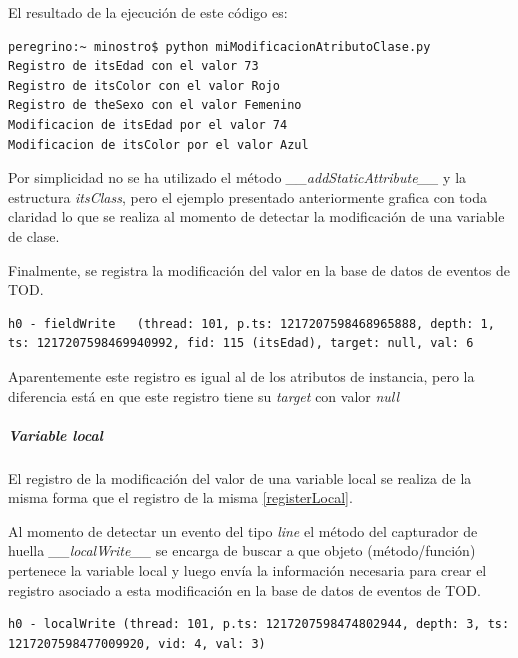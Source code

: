 \documentclass[12pt,legalpaper]{report}
\begin{document}
El resultado de la ejecución de este código es:

\begin{singlespace}
\begin{lstlisting}[style=consola,numbers=none]
peregrino:~ minostro$ python miModificacionAtributoClase.py
Registro de itsEdad con el valor 73
Registro de itsColor con el valor Rojo
Registro de theSexo con el valor Femenino
Modificacion de itsEdad por el valor 74
Modificacion de itsColor por el valor Azul
\end{lstlisting}
\end{singlespace}

Por simplicidad no se ha utilizado el método  \textit{\_\_addStaticAttribute\_\_} y la estructura \textit{itsClass}, pero el ejemplo presentado anteriormente grafica con toda claridad lo que se realiza al momento de detectar la modificación de una variable de clase.

Finalmente, se registra la modificación del valor en la base de datos de eventos de TOD.

\begin{singlespace}
\begin{lstlisting}[style=consola,numbers=none]
h0 - fieldWrite   (thread: 101, p.ts: 1217207598468965888, depth: 1, ts: 1217207598469940992, fid: 115 (itsEdad), target: null, val: 6
\end{lstlisting}
\end{singlespace}

Aparentemente este registro es igual al de los atributos de instancia, pero la diferencia está en que este registro tiene su \textit{target} con valor \textit{null}
	
					\subparagraph{Variable local}

El registro de la modificación del valor de una variable local se realiza de la misma forma que el registro de la misma \ref{registerLocal}.

Al momento de detectar un evento del tipo \textit{line} el método del capturador de huella \textit{\_\_localWrite\_\_} se encarga de buscar a 	que objeto (método/función) pertenece la variable local y luego envía la información necesaria para crear el registro asociado a esta modificación en la base de datos de eventos de TOD.

\begin{singlespace}
\begin{lstlisting}[style=consola,numbers=none]
h0 - localWrite (thread: 101, p.ts: 1217207598474802944, depth: 3, ts: 1217207598477009920, vid: 4, val: 3)
\end{lstlisting}
\end{singlespace}					
\end{document}
